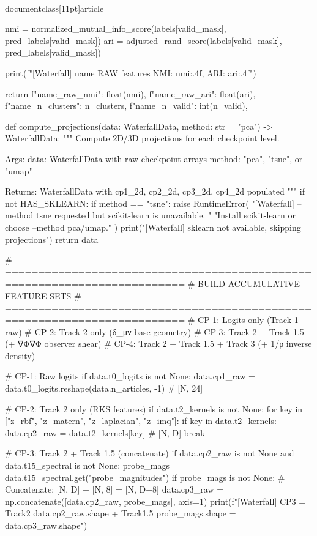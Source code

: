 \\documentclass[11pt]{article}
\begin{document}
\begin{CodeBlock}
    nmi = normalized_mutual_info_score(labels[valid_mask], pred_labels[valid_mask])
    ari = adjusted_rand_score(labels[valid_mask], pred_labels[valid_mask])

    print(f"[Waterfall] {name} RAW features NMI: {nmi:.4f}, ARI: {ari:.4f}")

    return {
        f"{name}_raw_nmi": float(nmi),
        f"{name}_raw_ari": float(ari),
        f"{name}_n_clusters": n_clusters,
        f"{name}_n_valid": int(n_valid),
    }


def compute_projections(data: WaterfallData, method: str = "pca") -> WaterfallData:
    """
    Compute 2D/3D projections for each checkpoint level.

    Args:
        data: WaterfallData with raw checkpoint arrays
        method: "pca", "tsne", or "umap"

    Returns:
        WaterfallData with cp1_2d, cp2_2d, cp3_2d, cp4_2d populated
    """
    if not HAS_SKLEARN:
        if method == "tsne":
            raise RuntimeError(
                "[Waterfall] --method tsne requested but scikit-learn is unavailable. "
                "Install scikit-learn or choose --method pca/umap."
            )
        print("[Waterfall] sklearn not available, skipping projections")
        return data

    # =========================================================================
    # BUILD ACCUMULATIVE FEATURE SETS
    # =========================================================================
    # CP-1: Logits only (Track 1 raw)
    # CP-2: Track 2 only (δ_μν base geometry)
    # CP-3: Track 2 + Track 1.5 (+ ∇Φ∇Φ observer shear)
    # CP-4: Track 2 + Track 1.5 + Track 3 (+ 1/ρ inverse density)

    # CP-1: Raw logits
    if data.t0_logits is not None:
        data.cp1_raw = data.t0_logits.reshape(data.n_articles, -1)  # [N, 24]

    # CP-2: Track 2 only (RKS features)
    if data.t2_kernels is not None:
        for key in ["z_rbf", "z_matern", "z_laplacian", "z_imq"]:
            if key in data.t2_kernels:
                data.cp2_raw = data.t2_kernels[key]  # [N, D]
                break

    # CP-3: Track 2 + Track 1.5 (concatenate)
    if data.cp2_raw is not None and data.t15_spectral is not None:
        probe_mags = data.t15_spectral.get("probe_magnitudes")
        if probe_mags is not None:
            # Concatenate: [N, D] + [N, 8] = [N, D+8]
            data.cp3_raw = np.concatenate([data.cp2_raw, probe_mags], axis=1)
            print(f"[Waterfall] CP3 = Track2 {data.cp2_raw.shape} + Track1.5 {probe_mags.shape} = {data.cp3_raw.shape}")


\end{CodeBlock}
\end{document}
